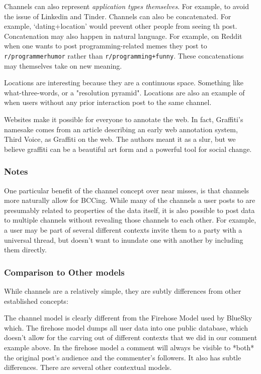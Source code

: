 Channels can also represent \emph{application types themselves}.
For example, to avoid the issue of Linkedin and Tinder.
Channels can also be concatenated.
For example, `dating+location' would prevent other people from seeing th post.
Concatenation may also happen in natural language.
For example, on Reddit when one wants to post programming-related memes they post to \texttt{r/programmerhumor} rather than \texttt{r/programming+funny}.
These concatenations may themselves take on new meaning.

Locations are interesting because they are a continuous space.
Something like what-three-words, or a "resolution pyramid".
Locations are also an example of when users without any prior interaction
post to the same channel.

Websites make it possible for everyone to annotate the web.
In fact, Graffiti's namesake comes from an article
describing an early web annotation system, Third Voice,
as Graffiti on the web.
The authors meant it as a slur, but we believe graffiti
can be a beautiful art form and a powerful tool for social change.

\subsubsection{Notes}

One particular benefit of the channel concept over near misses, is that channels more naturally allow for BCCing.
While many of the channels a user posts to are presumably related to properties of the data itself, it is also possible to post data to multiple channels without revealing those channels to each other.
For example, a user may be part of several different contexts invite them to a party with a universal thread, but doesn't want to inundate one with another by including them directly.

\subsubsection{Comparison to Other models}

While channels are a relatively simple, they are subtly differences from other established concepts:

The channel model is clearly different from the Firehose Model used by BlueSky
which.
The firehose model dumps all user data into one public database,
which doesn't allow for the carving out of different contexts that we did in our comment
example above. In the firehose model a comment will always be visible to *both* the original post's audience and
the commenter's followers.
It also has subtle differences.
There are several other contextual models.

